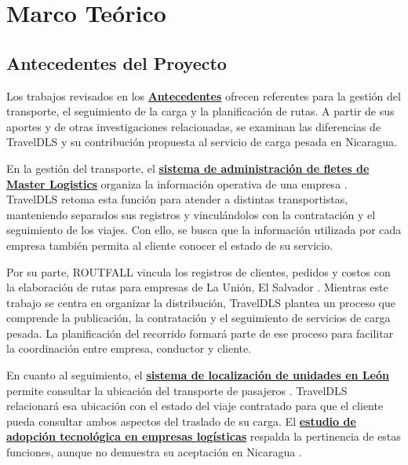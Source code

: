 
\section{Marco Teórico}
\label{sec:marco-teorico}

\subsection{Antecedentes del Proyecto}
\label{sec:antecedentes-proyecto}

Los trabajos revisados en los \textbf{\hyperref[sec:antecedentes]{Antecedentes}} ofrecen referentes para la gestión del transporte, el seguimiento de la carga y la planificación de rutas. A partir de sus aportes y de otras investigaciones relacionadas, se examinan las diferencias de TravelDLS y su contribución propuesta al servicio de carga pesada en Nicaragua.

En la gestión del transporte, el \textbf{\hyperref[ant:aragon]{sistema de administración de fletes de Master Logistics}} organiza la información operativa de una empresa \parencite[pp.~2, 9]{aragon2018implementacion}. TravelDLS retoma esta función para atender a distintas transportistas, manteniendo separados sus registros y vinculándolos con la contratación y el seguimiento de los viajes. Con ello, se busca que la información utilizada por cada empresa también permita al cliente conocer el estado de su servicio.

Por su parte, ROUTFALL vincula los registros de clientes, pedidos y costos con la elaboración de rutas para empresas de La Unión, El Salvador \parencite[pp.~52--53, 59--60]{flores2017rutas}. Mientras este trabajo se centra en organizar la distribución, TravelDLS plantea un proceso que comprende la publicación, la contratación y el seguimiento de servicios de carga pesada. La planificación del recorrido formará parte de ese proceso para facilitar la coordinación entre empresa, conductor y cliente.

En cuanto al seguimiento, el \textbf{\hyperref[ant:garcia]{sistema de localización de unidades en León}} permite consultar la ubicación del transporte de pasajeros \parencite[pp.~3, 7]{garcia2022desarrollo}. TravelDLS relacionará esa ubicación con el estado del viaje contratado para que el cliente pueda consultar ambos aspectos del traslado de su carga. El \textbf{\hyperref[ant:pauzuoliene]{estudio de adopción tecnológica en empresas logísticas}} respalda la pertinencia de estas funciones, aunque no demuestra su aceptación en Nicaragua \parencite[pp.~988--989]{pauzuoliene2024smart}.

